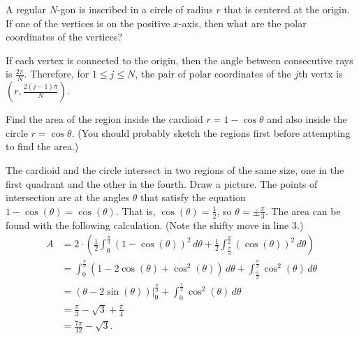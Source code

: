 \begin{problem}
  A regular $N$-gon is inscribed in a circle of radius $r$ that is centered at the origin. If one of the vertices is on the positive $x$-axis, then what are the polar coordinates of the vertices?
\end{problem}
\begin{solution}
  If each vertex is connected to the origin, then the angle between consecutive rays is $\frac{2\pi}N$. Therefore, for $1\leq j\leq N$, the pair of polar coordinates of the $j$th vertx is $\left(r,\frac{2(j-1)\pi}{N}\right)$.
\end{solution}

\begin{problem}
  Find the area of the region inside the cardioid $r=1-\cos\theta$ and also inside the circle $r=\cos\theta$. (You should probably sketch the regions first before attempting to find the area.)
\end{problem}
\begin{solution}
  The cardioid and the circle intersect in two regions of the same size, one in the first quadrant and the other in the fourth. Draw a picture. The points of intersection are at the angles $\theta$ that satisfy the equation $1-\cos(\theta)=\cos(\theta)$. That is, $\cos(\theta)=\frac12$, so $\theta=\pm\frac\pi3$. The area can be found with the following calculation. (Note the shifty move in line 3.)
  \[\begin{split}
    A &= 2\cdot\left(\frac12\int_0^{\frac\pi3}(1-\cos(\theta))^2\,d\theta+\frac12\int_{\frac\pi3}^{\frac\pi2}(\cos(\theta))^2\,d\theta\right)\\
    &= \int_0^{\frac\pi3}(1-2\cos(\theta)+\cos^2(\theta))\,d\theta+\int_{\frac\pi3}^{\frac\pi2}\cos^2(\theta)\,d\theta\\
    &= (\theta-2\sin(\theta))\Big|_0^{\frac\pi3}+\int_0^{\frac\pi2}\cos^2(\theta)\,d\theta\\
    &= \frac\pi3-\sqrt3+\frac\pi4\\
    &=\frac{7\pi}{12}-\sqrt3.
  \end{split}\]
\end{solution}

